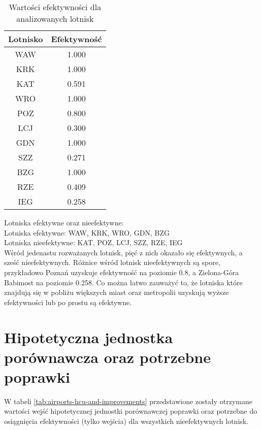 \documentclass[a4paper,12pt]{article}
\begin{document}
\begin{table}[H]
    \centering
    \begin{tabular}{c|c}
    \hline
         Lotnisko & Efektywność  \\ \hline
         WAW & 1.000 \\
         KRK & 1.000 \\
         KAT & 0.591 \\
         WRO & 1.000 \\
         POZ & 0.800 \\
         LCJ & 0.300 \\
         GDN & 1.000 \\
         SZZ & 0.271 \\
         BZG & 1.000 \\
         RZE & 0.409 \\
         IEG & 0.258 \\   
    \hline
    \end{tabular}
    \caption{Wartości efektywności dla analizowanych lotnisk}
    \label{tab:airports-efficiency}
\end{table}

\noindent Lotniska efektywne oraz nieefektywne: \\
Lotniska efektywne: WAW, KRK, WRO, GDN, BZG \\
Lotniska nieefektywne: KAT, POZ, LCJ, SZZ, RZE, IEG \\
Wśród jedenastu rozważanych lotnisk, pięć z nich okazało się efektywnych, a sześć nieefektywnych.
Różnice wśród lotnisk nieefektywnych są spore, przykładowo Poznań uzyskuje efektywność na poziomie 0.8, a Zielona-Góra Babimost na poziomie 0.258.
Co można łatwo zauważyć to, że lotniska które znajdują się w pobliżu większych miast oraz metropolii uzyskują wyższe efektywności lub po prostu są efektywne.


\section{Hipotetyczna jednostka porównawcza oraz potrzebne poprawki}

W tabeli \ref{tab:airports-hcu-and-improvements} przedstawione zostały otrzymane wartości wejść hipotetycznej jednostki porównawczej poprawki oraz potrzebne do osiągnięcia efektywności (tylko wejścia) dla wszystkich nieefektywnych lotnisk.
\end{document}
